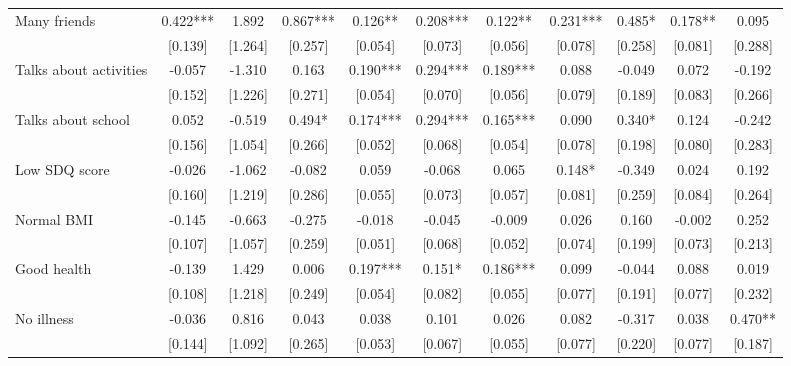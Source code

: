 \documentclass[12pt]{article}
\begin{document}
\begin{table}[ht]
\begin{center}
\begin{adjustbox}{width=1.2\textwidth,center=\textwidth}
\begin{tabular}{l*{10}{c}}
Many friends & 0.422*** & 1.892 & 0.867*** & 0.126** & 0.208*** & 0.122** & 0.231*** & 0.485* & 0.178** & 0.095 \\
 & [0.139] & [1.264] & [0.257] & [0.054] & [0.073] & [0.056] & [0.078] & [0.258] & [0.081] & [0.288] \\
Talks about activities & -0.057 & -1.310 & 0.163 & 0.190*** & 0.294*** & 0.189*** & 0.088 & -0.049 & 0.072 & -0.192 \\
 & [0.152] & [1.226] & [0.271] & [0.054] & [0.070] & [0.056] & [0.079] & [0.189] & [0.083] & [0.266] \\
Talks about school & 0.052 & -0.519 & 0.494* & 0.174*** & 0.294*** & 0.165*** & 0.090 & 0.340* & 0.124 & -0.242 \\
 & [0.156] & [1.054] & [0.266] & [0.052] & [0.068] & [0.054] & [0.078] & [0.198] & [0.080] & [0.283] \\
Low SDQ score  & -0.026 & -1.062 & -0.082 & 0.059 & -0.068 & 0.065 & 0.148* & -0.349 & 0.024 & 0.192 \\
 & [0.160] & [1.219] & [0.286] & [0.055] & [0.073] & [0.057] & [0.081] & [0.259] & [0.084] & [0.264] \\
Normal BMI & -0.145 & -0.663 & -0.275 & -0.018 & -0.045 & -0.009 & 0.026 & 0.160 & -0.002 & 0.252 \\
 & [0.107] & [1.057] & [0.259] & [0.051] & [0.068] & [0.052] & [0.074] & [0.199] & [0.073] & [0.213] \\
Good health & -0.139 & 1.429 & 0.006 & 0.197*** & 0.151* & 0.186*** & 0.099 & -0.044 & 0.088 & 0.019 \\
 & [0.108] & [1.218] & [0.249] & [0.054] & [0.082] & [0.055] & [0.077] & [0.191] & [0.077] & [0.232] \\
No illness & -0.036 & 0.816 & 0.043 & 0.038 & 0.101 & 0.026 & 0.082 & -0.317 & 0.038 & 0.470** \\
 & [0.144] & [1.092] & [0.265] & [0.053] & [0.067] & [0.055] & [0.077] & [0.220] & [0.077] & [0.187] \\

\end{tabular}
\end{adjustbox}
\end{center}
\end{table}
\end{document}
